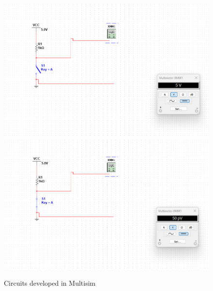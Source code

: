 \documentclass[12pt]{article}  %
\begin{document}
\begin{figure}[H]
    \centering
    \includegraphics[scale=0.3]{Prueba1.png}
    \hfill
    \includegraphics[scale=0.3]{Prueba2.png}
    \caption{Circuits developed in Multisim}
    \label{fig:multisim_circuits_measurements}
\end{figure}
\end{document}
